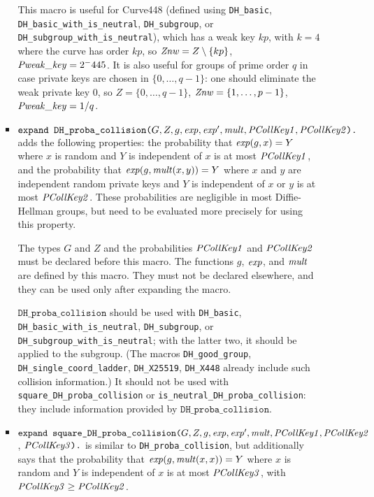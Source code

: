 \documentclass{article}
\begin{document}
\begin{itemize}
\begin{itemize}
\begin{itemize}
This macro is useful for Curve448 (defined using \texttt{DH\_basic}, \texttt{DH\_basic\_with\_is\_neutral}, \texttt{DH\_subgroup}, or \texttt{DH\_subgroup\_with\_is\_neutral}), which has a weak key $kp$, with $k = 4$ where the curve has order
$kp$, so $\mathit{Znw} = Z \setminus \{ kp \}$, $\mathit{Pweak\_key} = 2^-445$.
It is also useful for groups of prime order $q$ in case private keys are chosen in $\{0,\dots,q-1\}$:
one should eliminate the weak private key $0$, so $Z = \{0,\dots, q-1\}$, $\mathit{Znw} = \{1,\dots,p-1\}$, $\mathit{Pweak\_key} = 1/q$.
       
     \item $\texttt{expand\ DH\_proba\_collision(}G, Z, g, \vn{exp},
       \vn{exp}', \vn{mult}, \vn{PCollKey1},
       \vn{PCollKey2}\texttt{).}$ adds the following properties:
       the probability that $\mathit{exp}(g, x) = Y$ where $x$ is random and
       $Y$ is independent of $x$ is at most $\mathit{PCollKey1}$, and
       the probability that $\mathit{exp}(g, \mathit{mult}(x,y)) = Y$ where
       $x$ and $y$ are independent random private keys and 
       $Y$ is independent of $x$ or $y$ is at most
       $\mathit{PCollKey2}$. These probabilities are negligible in most
       Diffie-Hellman groups, but need to be evaluated more precisely
       for using this property.
       
       The types $G$ and $Z$ and the probabilities $\mathit{PCollKey1}$
       and $\mathit{PCollKey2}$ must be declared before this macro.  The
       functions $g$, $\mathit{exp}$, and $\mathit{mult}$ are defined by this
       macro. They must not be declared elsewhere, and they can be
       used only after expanding the macro.

       $\texttt{DH\_proba\_collision}$ should be used with 
       \texttt{DH\_basic}, \texttt{DH\_basic\_with\_is\_neutral},
       \texttt{DH\_subgroup}, or \texttt{DH\_subgroup\_with\_is\_neutral};
       with the latter two,
       it should be applied to the subgroup. (The macros
       \texttt{DH\_good\_group}, \texttt{DH\_single\_coord\_ladder},
       \texttt{DH\_X25519}, \texttt{DH\_X448} already include such collision
       information.) It should not be used with \texttt{square\_DH\_proba\_collision} or \texttt{is\_neutral\_DH\_proba\_collision}:
       they include information provided by $\texttt{DH\_proba\_collision}$.

     \item $\texttt{expand\ square\_DH\_proba\_collision(}G, Z, g, \vn{exp},
       \vn{exp}', \vn{mult}, \vn{PCollKey1},
       \vn{PCollKey2}$, $\mathit{PCollKey3}\texttt{).}$ is similar to \texttt{DH\_proba\_collision}, but additionally
   says that the probability that $\mathit{exp}(g, \mathit{mult}(x,x)) = Y$ where
   $x$ is random and $Y$ is independent of $x$ is at most $\mathit{PCollKey3}$, with $\mathit{PCollKey3} \geq \mathit{PCollKey2}$.
       

\end{itemize}
\end{itemize}
\end{itemize}
\end{document}
